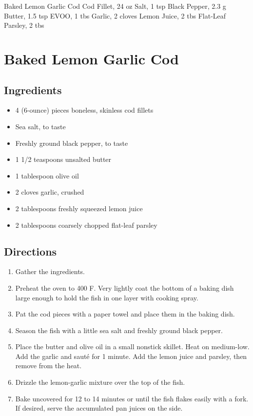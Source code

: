 Baked Lemon Garlic Cod
  Cod Fillet, 24 oz
  Salt, 1 tsp
  Black Pepper, 2.3 g
  Butter, 1.5 tsp
  EVOO, 1 tbs
  Garlic, 2 cloves
  Lemon Juice, 2 tbs
  Flat-Leaf Parsley, 2 tbs
\section{ Baked Lemon Garlic Cod }

\subsection{ Ingredients }

\begin{itemize}
  \item 4 (6-ounce) pieces boneless, skinless cod fillets
  \item Sea salt, to taste
  \item Freshly ground black pepper, to taste 
  \item 1 1/2 teaspoons unsalted butter 
  \item 1 tablespoon olive oil 
  \item 2 cloves garlic, crushed 
  \item 2 tablespoons freshly squeezed lemon juice 
  \item 2 tablespoons coarsely chopped flat-leaf parsley 
\end{itemize}

\subsection{ Directions }

\begin{enumerate}
  \item Gather the ingredients. 
  \item Preheat the oven to 400 F. Very lightly coat the bottom of a baking dish large enough to hold the fish in one layer with cooking spray. 
  \item Pat the cod pieces with a paper towel and place them in the baking dish. 
  \item Season the fish with a little sea salt and freshly ground black pepper.
  \item Place the butter and olive oil in a small nonstick skillet. Heat on medium-low. Add the garlic and sauté for 1 minute. Add the lemon juice and parsley, then remove from the heat. 
  \item Drizzle the lemon-garlic mixture over the top of the fish.
  \item Bake uncovered for 12 to 14 minutes or until the fish flakes easily with a fork. If desired, serve the accumulated pan juices on the side.
\end{enumerate}
